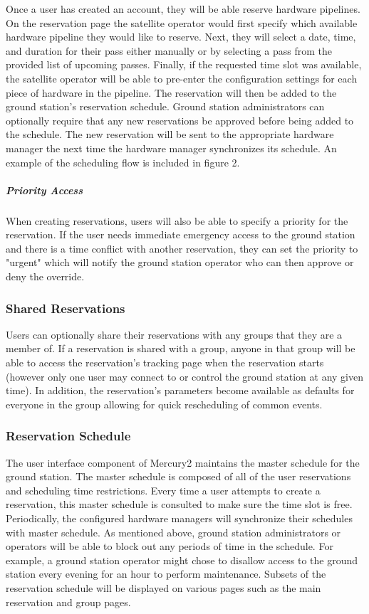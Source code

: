 \documentclass{mxl-design}
\begin{document}
Once a user has created an account, they will be able reserve hardware pipelines. On the reservation page the satellite operator would first specify which available hardware pipeline they would like to reserve. Next, they will select a date, time, and duration for their pass either manually or by selecting a pass from the provided list of upcoming passes. Finally, if the requested time slot was available, the satellite operator will be able to pre-enter the configuration settings for each piece of hardware in the pipeline. The reservation will then be added to the ground station's reservation schedule. Ground station administrators can optionally require that any new reservations be approved before being added to the schedule. The new reservation will be sent to the appropriate hardware manager the next time the hardware manager synchronizes its schedule. An example of the scheduling flow is included in figure 2.

\subparagraph{Priority Access} When creating reservations, users will also be able to specify a priority for the reservation. If the user needs immediate emergency access to the ground station and there is a time conflict with another reservation, they can set the priority to "urgent" which will notify the ground station operator who can then approve or deny the override.

\subsubsection{Shared Reservations}
Users can optionally share their reservations with any groups that they are a member of. If a reservation is shared with a group, anyone in that group will be able to access the reservation's tracking page when the reservation starts (however only one user may connect to or control the ground station at any given time). In addition, the reservation's parameters become available as defaults for everyone in the group allowing for quick rescheduling of common events.

\subsubsection{Reservation Schedule}
The user interface component of Mercury2 maintains the master schedule for the ground station. The master schedule is composed of all of the user reservations and scheduling time restrictions. Every time a user attempts to create a reservation, this master schedule is consulted to make sure the time slot is free. Periodically, the configured hardware managers will synchronize their schedules with master schedule. As mentioned above, ground station administrators or operators will be able to block out any periods of time in the schedule. For example, a ground station operator might chose to disallow access to the ground station every evening for an hour to perform maintenance. Subsets of the reservation schedule will be displayed on various pages such as the main reservation  and group pages.
 
\end{document}
